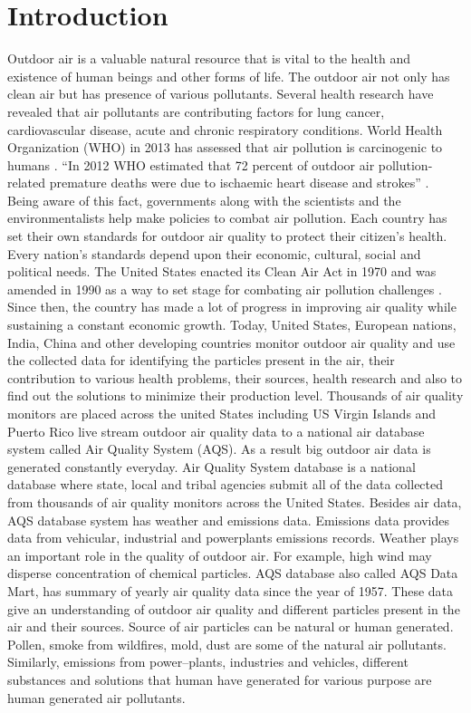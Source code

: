 \documentclass[sigconf]{acmart}
\begin{document}
{  \section{Introduction} Outdoor air is a valuable natural resource that is vital to the health and existence of human beings and other forms of life. The outdoor air not only has clean air but has presence of various pollutants. Several health research have revealed that air pollutants are contributing factors for lung cancer, cardiovascular disease, acute and chronic respiratory conditions. World Health Organization (WHO) in 2013 has assessed that air pollution is carcinogenic to humans \cite{www-who}. ``In 2012 WHO estimated that 72 percent of outdoor air pollution-related premature deaths were due to ischaemic heart disease and strokes'' \cite{www-who}. Being aware of this fact, governments along with the scientists and the environmentalists help make policies to combat air pollution. Each country has set their own standards for outdoor air quality to protect their citizen's health. Every nation's standards depend upon their economic, cultural, social and political needs. The United States enacted its Clean Air Act in 1970 and was amended in 1990 as a way to set stage for combating air pollution challenges \cite{epa-gov}. Since then, the country has made a lot of progress in improving air quality while sustaining a constant economic growth. Today, United States, European nations, India, China and other developing countries monitor outdoor air quality and use the collected data for identifying the particles present in the air, their contribution to various health problems, their sources, health research and also to find out the solutions to minimize their production level.
  Thousands of air quality monitors are placed  across the united States including US Virgin Islands and Puerto Rico live stream outdoor air quality data to a national air database system called Air Quality System (AQS). As a result big outdoor air data is generated constantly everyday. Air Quality System database is a national database where state, local and tribal agencies submit all of the data collected from thousands of air quality monitors across the United States. Besides air data, AQS database system has weather and emissions data. Emissions data provides data from vehicular, industrial and powerplants emissions records. Weather plays an important role in the quality of outdoor air. For example, high wind may disperse concentration of chemical particles. AQS database also called AQS Data Mart, has summary of yearly air quality data since the year of 1957. These data give an understanding of outdoor air quality and different particles present in the air and their sources. Source of air particles can be natural or human generated. Pollen, smoke from wildfires, mold, dust are some of the natural air pollutants. Similarly, emissions from power--plants, industries and vehicles, different substances and solutions that human have generated for various purpose are human generated air pollutants.
}
\end{document}
